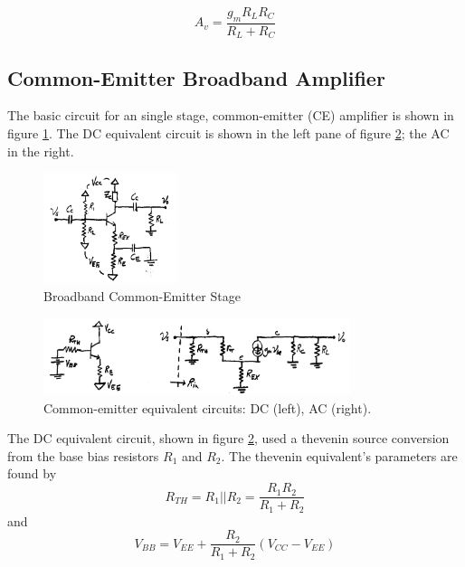 \documentclass[titlepage, letterpaper, 10.5pt]{article}
\begin{document}
\begin{equation}
A_{v}=\frac{g_{m}R_{L}R_{C}}{R_{L}+R_{C}}
\label{cbAv}
\end{equation}

\subsection{Common-Emitter Broadband Amplifier}

The basic circuit for an single stage, common-emitter (CE)
amplifier is shown in figure \ref{commonEmitterAmplifier}.
The DC equivalent circuit is shown in the left pane of figure
\ref{commonEmitterEquivalentCircuits}; the AC in the right.

\begin{figure}[ht]
	\centering
	\includegraphics[width=0.35\textwidth]
		{figures/commonEmitterAmplifier.png}
	\caption{
		Broadband Common-Emitter Stage
	}
	\label{commonEmitterAmplifier}
\end{figure}

\begin{figure}[ht]
	\centering
	\includegraphics[width=0.8\textwidth]
		{figures/commonEmitterEquivalentCircuits}
	\caption{
		Common-emitter equivalent circuits: DC (left),
		AC (right).
	}
	\label{commonEmitterEquivalentCircuits}
\end{figure}

The DC equivalent circuit, shown in figure
\ref{commonEmitterEquivalentCircuits}, used a thevenin source
conversion from the base bias resistors $R_{1}$ and $R_{2}$. The
thevenin equivalent's parameters are found by
\begin{equation}
R_{TH}=R_{1}||R_{2}=\frac{R_{1}R_{2}}{R_{1}+R_{2}}
\end{equation}
and
\begin{equation}
V_{BB}=V_{EE}+\frac{R_{2}}{R_{1}+R_{2}}(V_{CC}-V_{EE})
\end{equation}
\end{document}
